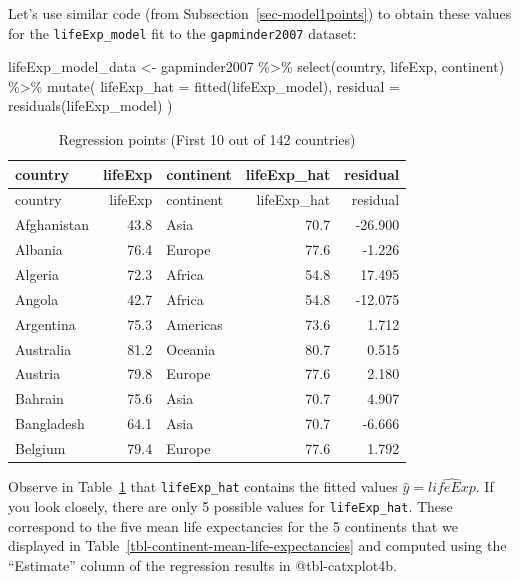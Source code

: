\documentclass[
  letterpaper,
  DIV=11,
  numbers=noendperiod]{scrreprt}
\newenvironment{Shaded}{\begin{snugshade}}{\end{snugshade}}
\newcommand{\AttributeTok}[1]{\textcolor[rgb]{0.40,0.45,0.13}{#1}}
\newcommand{\FunctionTok}[1]{\textcolor[rgb]{0.28,0.35,0.67}{#1}}
\newcommand{\NormalTok}[1]{\textcolor[rgb]{0.00,0.23,0.31}{#1}}
\newcommand{\OtherTok}[1]{\textcolor[rgb]{0.00,0.23,0.31}{#1}}
\newcommand{\SpecialCharTok}[1]{\textcolor[rgb]{0.37,0.37,0.37}{#1}}
\theoremstyle{definition}
\theoremstyle{remark}
\begin{document}
Let's use similar code (from Subsection~\ref{sec-model1points}) to
obtain these values for the \texttt{lifeExp\_model} fit to the
\texttt{gapminder2007} dataset:

\begin{Shaded}
\begin{Highlighting}[]
\NormalTok{lifeExp\_model\_data }\OtherTok{\textless{}{-}}\NormalTok{ gapminder2007 }\SpecialCharTok{\%\textgreater{}\%} 
  \FunctionTok{select}\NormalTok{(country, lifeExp, continent) }\SpecialCharTok{\%\textgreater{}\%} 
  \FunctionTok{mutate}\NormalTok{(}
    \AttributeTok{lifeExp\_hat =} \FunctionTok{fitted}\NormalTok{(lifeExp\_model),}
    \AttributeTok{residual =} \FunctionTok{residuals}\NormalTok{(lifeExp\_model)}
\NormalTok{    )}
\end{Highlighting}
\end{Shaded}

\hypertarget{tbl-lifeExp-reg-points}{}
\begin{longtable}[]{@{}lrlrr@{}}
\caption{\label{tbl-lifeExp-reg-points}Regression points (First 10 out
of 142 countries)}\tabularnewline
\toprule()
country & lifeExp & continent & lifeExp\_hat & residual \\
\midrule()
\endfirsthead
\toprule()
country & lifeExp & continent & lifeExp\_hat & residual \\
\midrule()
\endhead
Afghanistan & 43.8 & Asia & 70.7 & -26.900 \\
Albania & 76.4 & Europe & 77.6 & -1.226 \\
Algeria & 72.3 & Africa & 54.8 & 17.495 \\
Angola & 42.7 & Africa & 54.8 & -12.075 \\
Argentina & 75.3 & Americas & 73.6 & 1.712 \\
Australia & 81.2 & Oceania & 80.7 & 0.515 \\
Austria & 79.8 & Europe & 77.6 & 2.180 \\
Bahrain & 75.6 & Asia & 70.7 & 4.907 \\
Bangladesh & 64.1 & Asia & 70.7 & -6.666 \\
Belgium & 79.4 & Europe & 77.6 & 1.792 \\
\bottomrule()
\end{longtable}

Observe in Table~\ref{tbl-lifeExp-reg-points} that \texttt{lifeExp\_hat}
contains the fitted values \(\hat{y} = \widehat{lifeExp}\). If you look
closely, there are only 5 possible values for \texttt{lifeExp\_hat}.
These correspond to the five mean life expectancies for the 5 continents
that we displayed in Table~\ref{tbl-continent-mean-life-expectancies}
and computed using the ``Estimate'' column of the regression results in
@tbl-catxplot4b.
\end{document}
